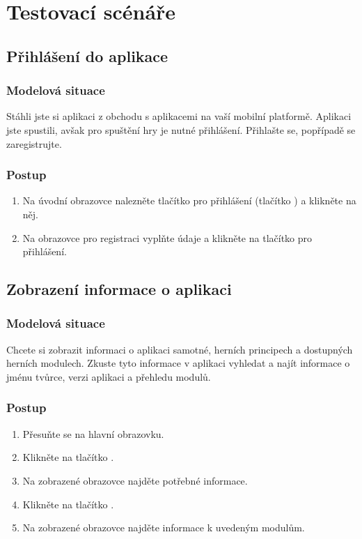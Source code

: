 \chapter{Testovací scénáře}
\label{chap:test-scenarios}

\section{Přihlášení do aplikace}

\subsection*{Modelová situace}

Stáhli jste si aplikaci z obchodu s aplikacemi na vaší mobilní platformě.
Aplikaci jste spustili,
avšak pro spuštění hry je nutné přihlášení.
Přihlašte se, popřípadě se zaregistrujte.

\subsection*{Postup}

\begin{enumerate}
    \item Na úvodní obrazovce nalezněte tlačítko pro přihlášení
    (tlačítko )
    a klikněte na něj.
    \item Na obrazovce pro registraci vyplňte údaje
    a klikněte na tlačítko pro přihlášení.
\end{enumerate}

\section{Zobrazení informace o aplikaci}

\subsection*{Modelová situace}

Chcete si zobrazit informaci o aplikaci samotné,
herních principech a dostupných herních modulech.
Zkuste tyto informace v aplikaci vyhledat a najít informace o
jménu tvůrce, verzi aplikaci a přehledu modulů.

\subsection*{Postup}

\begin{enumerate}
    \item Přesuňte se na hlavní obrazovku.
    \item Klikněte na tlačítko .
    \item Na zobrazené obrazovce najděte potřebné informace.
    \item Klikněte na tlačítko .
    \item Na zobrazené obrazovce najděte informace k uvedeným modulům.
\end{enumerate}

